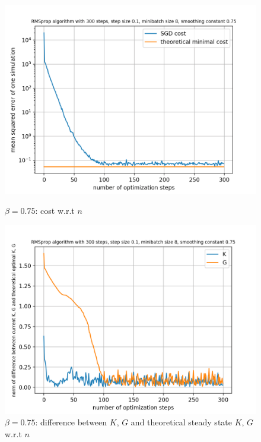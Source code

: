 \documentclass{article}
\begin{document}
\begin{figure}[h!]
	\centering
	\begin{minipage}[t]{.28\paperwidth}
		\centering
		\includegraphics[width=1.0\textwidth]{Figures/beta_0_75.png}
		\caption{$\beta = 0.75$: cost w.r.t $n$}
	\end{minipage}%
	\begin{minipage}[t]{.28\paperwidth}
		\centering
		\includegraphics[width=1.0\textwidth]{Figures/d_beta_0_75.png}
		\caption{$\beta = 0.75$: difference between $K$, $G$ and theoretical steady state $K$, $G$ w.r.t $n$}
	\end{minipage}%
	\begin{minipage}[t]{.28\paperwidth}
		\centering

\end{minipage}
\end{figure}
\end{document}
